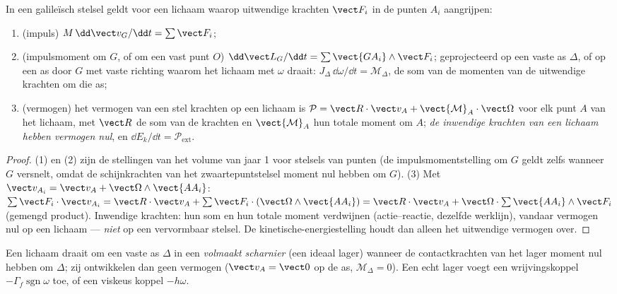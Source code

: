 \begin{theorem}\label{thm:b2:rigid-body-mechanics:laws}
In een galileïsch stelsel geldt voor een lichaam waarop uitwendige
krachten $\vect F_i$ in de punten $A_i$ aangrijpen:
\begin{enumerate}
  \item (impuls) $M\,\dd\vect v_G/\dd t = \sum\vect F_i$;
  \item (impulsmoment om $G$, of om een vast punt $O$)
        $\dd\vect L_G/\dd t = \sum\vect{GA_i}\wedge\vect F_i$; geprojecteerd
        op een vaste as $\Delta$, of op een as door $G$ met vaste richting
        waarom het lichaam met $\omega$ draait:
        $J_\Delta\,\dd\omega/\dd t = \mathcal M_\Delta$, de som van de
        momenten van de uitwendige krachten om die as;
  \item (vermogen) het vermogen van een stel krachten op een lichaam is
        $\mathcal P = \vect R\cdot\vect v_A + \vect{\mathcal M}_A\cdot
        \vect\Omega$
        voor elk punt $A$ van het lichaam, met $\vect R$ de
        som van de krachten en $\vect{\mathcal M}_A$ hun totale moment om
        $A$; \emph{de inwendige krachten van een lichaam hebben vermogen
        nul}, en $\dd E_k/\dd t = \mathcal P_{\text{ext}}$.
\end{enumerate}
\end{theorem}

\begin{proof}
(1) en (2) zijn de stellingen van het volume van jaar 1 voor stelsels van
punten (de impulsmomentstelling om $G$ geldt zelfs wanneer $G$ versnelt,
omdat de schijnkrachten van het zwaartepuntstelsel moment nul hebben om
$G$). (3) Met $\vect v_{A_i} = \vect v_A + \vect\Omega
\wedge\vect{AA_i}$:
$\sum\vect F_i\cdot\vect v_{A_i} = \vect R\cdot\vect v_A
+ \sum\vect F_i\cdot(\vect\Omega\wedge\vect{AA_i}) = \vect R\cdot\vect v_A +
\vect\Omega\cdot\sum\vect{AA_i}\wedge\vect F_i$
(gemengd product). Inwendige
krachten: hun som en hun totale moment verdwijnen (actie--reactie, dezelfde
werklijn), vandaar vermogen nul op een lichaam --- \emph{niet} op een
vervormbaar stelsel. De kinetische-energiestelling houdt dan alleen het
uitwendige vermogen over.
\end{proof}

\begin{definition}\label{def:b2:rigid-body-mechanics:pivot}
Een lichaam draait om een vaste as $\Delta$ in een \emph{volmaakt
scharnier} (een ideaal lager) wanneer de contactkrachten van het lager
moment nul hebben om $\Delta$; zij ontwikkelen dan geen vermogen
($\vect v_A = \vect 0$ op de as, $\mathcal M_\Delta = 0$). Een echt lager
voegt een wrijvingskoppel $-\Gamma_f\operatorname{sgn}\omega$ toe, of een
viskeus koppel $-h\omega$.
\end{definition}

